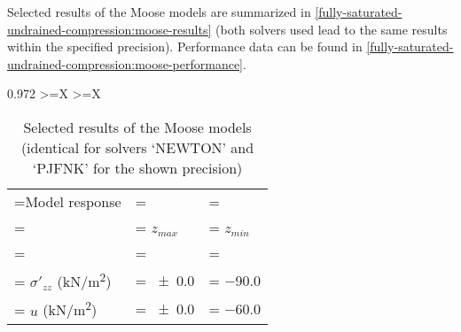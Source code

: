 

Selected results of the Moose models are summarized in
\autoref{fully-saturated-undrained-compression:moose-results} (both solvers
used lead to the same results within the specified precision). Performance data
can be found in
\autoref{fully-saturated-undrained-compression:moose-performance}.

\begin{table}[htbp]
    \centering
    \caption{Selected results of the Moose models \\(identical for solvers ‘NEWTON’ and ‘PJFNK’ for the shown precision)}
    \label{fully-saturated-undrained-compression:moose-results}

    \begin{tabularx}{0.972\hsize}{
            >{\hsize\linewidth=\hsize}X
            >{\hsize\linewidth=\hsize}X}
        {\begin{tabularx}{1\linewidth}{
                     >{\hsize\linewidth=\hsize}X
                     >{\hsize\linewidth=\hsize\hspace{-5pt}}Y
                     >{\hsize\linewidth=\hsize\hspace{-5pt}}Y}
                 \toprule
                 Model response                                                                        &                      \\
                 {}                                                                                    & $z_{max}$                    & $z_{min}$         \\
                 \midrule

                                                                                                                   \\
                 \hspace{1em} $\sigma'_{zz}$ (\unit[per-mode = symbol]{\kilo\newton\per\square\metre}) & \qty{\pm0.0}{}               & \qty{-90.0}{}     \\
                 \hspace{1em} $u$            (\unit[per-mode = symbol]{\kilo\newton\per\square\metre}) & \qty{\pm0.0}{}               & \qty{-60.0}{}     \\


\end{tabularx}}
\end{tabularx}
\end{table}
